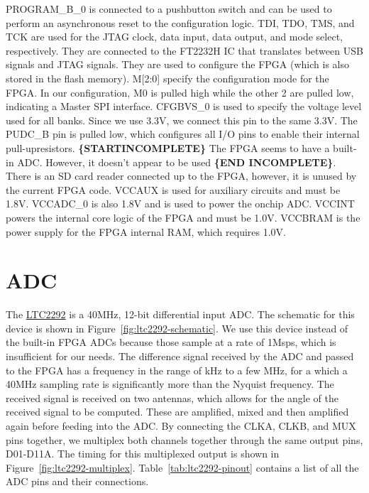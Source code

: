 \documentclass{default}
\begin{document}
PROGRAM\_B\_0 is connected to a pushbutton switch and can be used to perform an asynchronous reset
to the configuration logic. TDI, TDO, TMS, and TCK are used for the JTAG clock, data input, data
output, and mode select, respectively. They are connected to the FT2232H IC that translates between
USB signals and JTAG signals. They are used to configure the FPGA (which is also stored in the flash
memory). M[2:0] specify the configuration mode for the FPGA. In our configuration, M0 is pulled high
while the other 2 are pulled low, indicating a Master SPI interface. CFGBVS\_0 is used to specify
the voltage level used for all banks. Since we use 3.3V, we connect this pin to the same 3.3V. The
PUDC\_B pin is pulled low, which configures all I/O pins to enable their internal
pull-upresistors. \textbf{\{STARTINCOMPLETE\}} The FPGA seems to have a built-in ADC. However, it
doesn't appear to be used \textbf{\{END INCOMPLETE\}}. There is an SD card reader connected up to
the FPGA, however, it is unused by the current FPGA code. VCCAUX is used for auxiliary circuits and
must be 1.8V. VCCADC\_0 is also 1.8V and is used to power the onchip ADC. VCCINT powers the internal
core logic of the FPGA and must be 1.0V. VCCBRAM is the power supply for the FPGA internal RAM,
which requires 1.0V.

\section{ADC}

The \href{http://www.analog.com/media/en/technical-documentation/data-sheets/229321fa.pdf}{LTC2292}
is a 40MHz, 12-bit differential input ADC. The schematic for this device is shown in
Figure~\ref{fig:ltc2292-schematic}. We use this device instead of the built-in FPGA ADCs
because those sample at a rate of 1Msps, which is insufficient for our needs. The difference signal
received by the ADC and passed to the FPGA has a frequency in the range of kHz to a few MHz, for a
which a 40MHz sampling rate is significantly more than the Nyquist frequency. The received signal
is received on two antennas, which allows for the angle of the received signal to be computed. These
are amplified, mixed and then amplified again before feeding into the ADC. By connecting the CLKA,
CLKB, and MUX pins together, we multiplex both channels together through the same output pins,
D01-D11A. The timing for this multiplexed output is shown in
Figure~\ref{fig:ltc2292-multiplex}. Table~\ref{tab:ltc2292-pinout} contains a list of all the ADC
pins and their connections.
\end{document}

